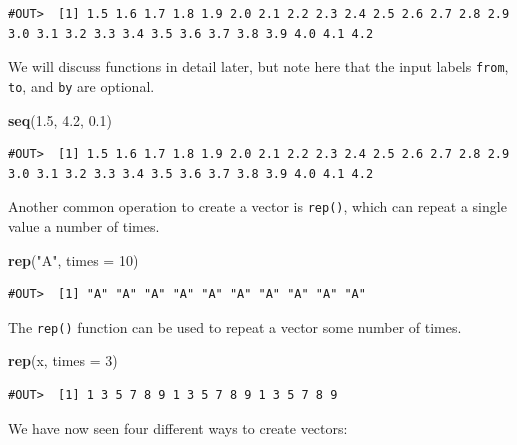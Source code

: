 \documentclass[]{book}
\newenvironment{Shaded}{\begin{snugshade}}{\end{snugshade}}
\newcommand{\DataTypeTok}[1]{\textcolor[rgb]{0.13,0.29,0.53}{#1}}
\newcommand{\DecValTok}[1]{\textcolor[rgb]{0.00,0.00,0.81}{#1}}
\newcommand{\FloatTok}[1]{\textcolor[rgb]{0.00,0.00,0.81}{#1}}
\newcommand{\KeywordTok}[1]{\textcolor[rgb]{0.13,0.29,0.53}{\textbf{#1}}}
\newcommand{\NormalTok}[1]{#1}
\newcommand{\StringTok}[1]{\textcolor[rgb]{0.31,0.60,0.02}{#1}}
\begin{document}
\begin{verbatim}
#OUT>  [1] 1.5 1.6 1.7 1.8 1.9 2.0 2.1 2.2 2.3 2.4 2.5 2.6 2.7 2.8 2.9 3.0 3.1 3.2 3.3 3.4 3.5 3.6 3.7 3.8 3.9 4.0 4.1 4.2
\end{verbatim}

We will discuss functions in detail later, but note here that the input labels \texttt{from}, \texttt{to}, and \texttt{by} are optional.

\begin{Shaded}
\begin{Highlighting}[]
\KeywordTok{seq}\NormalTok{(}\FloatTok{1.5}\NormalTok{, }\FloatTok{4.2}\NormalTok{, }\FloatTok{0.1}\NormalTok{)}
\end{Highlighting}
\end{Shaded}

\begin{verbatim}
#OUT>  [1] 1.5 1.6 1.7 1.8 1.9 2.0 2.1 2.2 2.3 2.4 2.5 2.6 2.7 2.8 2.9 3.0 3.1 3.2 3.3 3.4 3.5 3.6 3.7 3.8 3.9 4.0 4.1 4.2
\end{verbatim}

Another common operation to create a vector is \texttt{rep()}, which can repeat a single value a number of times.

\begin{Shaded}
\begin{Highlighting}[]
\KeywordTok{rep}\NormalTok{(}\StringTok{"A"}\NormalTok{, }\DataTypeTok{times =} \DecValTok{10}\NormalTok{)}
\end{Highlighting}
\end{Shaded}

\begin{verbatim}
#OUT>  [1] "A" "A" "A" "A" "A" "A" "A" "A" "A" "A"
\end{verbatim}

The \texttt{rep()} function can be used to repeat a vector some number of times.

\begin{Shaded}
\begin{Highlighting}[]
\KeywordTok{rep}\NormalTok{(x, }\DataTypeTok{times =} \DecValTok{3}\NormalTok{)}
\end{Highlighting}
\end{Shaded}

\begin{verbatim}
#OUT>  [1] 1 3 5 7 8 9 1 3 5 7 8 9 1 3 5 7 8 9
\end{verbatim}

We have now seen four different ways to create vectors:
\end{document}
